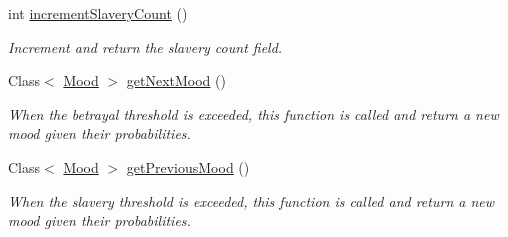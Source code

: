 \begin{DoxyCompactItemize}
int \hyperlink{classgameplay_1_1ai_1_1mood_1_1_mood_ac416312a82ad5afce4090858b47b0c96}{increment\-Slavery\-Count} ()
\begin{DoxyCompactList}\small\item\em Increment and return the slavery count field. \end{DoxyCompactList}\item 
Class$<$ \hyperlink{classgameplay_1_1ai_1_1mood_1_1_mood}{Mood} $>$ \hyperlink{classgameplay_1_1ai_1_1mood_1_1_mood_aa0080ad0116bb5b614bbbc56d448ad22}{get\-Next\-Mood} ()
\begin{DoxyCompactList}\small\item\em When the betrayal threshold is exceeded, this function is called and return a new mood given their probabilities. \end{DoxyCompactList}\item 
Class$<$ \hyperlink{classgameplay_1_1ai_1_1mood_1_1_mood}{Mood} $>$ \hyperlink{classgameplay_1_1ai_1_1mood_1_1_mood_aceaadc827da68781c215cf280a8062f8}{get\-Previous\-Mood} ()
\begin{DoxyCompactList}\small\item\em When the slavery threshold is exceeded, this function is called and return a new mood given their probabilities. \end{DoxyCompactList}\end{DoxyCompactItemize}
